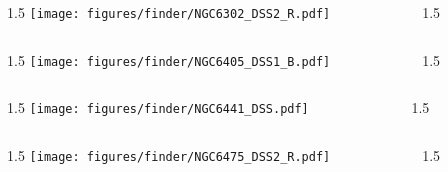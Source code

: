\documentclass[final]{beamer}
\newlength{\colwidth}
\begin{document}

\begin{frame}[t]{}
  \begin{columns}[T]
    \begin{column}{1.5\colwidth}
      \centering
      \texttt{[image: figures/finder/NGC6302\_DSS2\_R.pdf]}
    \end{column}
    \begin{column}{1.5\colwidth}
      \Large
      
    \end{column}
  \end{columns}
  \vspace{\fill}
  \begin{columns}[T]
    \begin{column}{1.5\colwidth}
      \centering
      \texttt{[image: figures/finder/NGC6405\_DSS1\_B.pdf]}
    \end{column}
    \begin{column}{1.5\colwidth}
      \Large
      
    \end{column}
  \end{columns}
\end{frame}


\begin{frame}[t]{}
  \begin{columns}[T]
    \begin{column}{1.5\colwidth}
      \centering
      \texttt{[image: figures/finder/NGC6441\_DSS.pdf]}
    \end{column}
    \begin{column}{1.5\colwidth}
      \Large
      
    \end{column}
  \end{columns}
  \vspace{\fill}
  \begin{columns}[T]
    \begin{column}{1.5\colwidth}
      \centering
      \texttt{[image: figures/finder/NGC6475\_DSS2\_R.pdf]}
    \end{column}
    \begin{column}{1.5\colwidth}
      \Large
      
    \end{column}
  \end{columns}
\end{frame}
\end{document}
